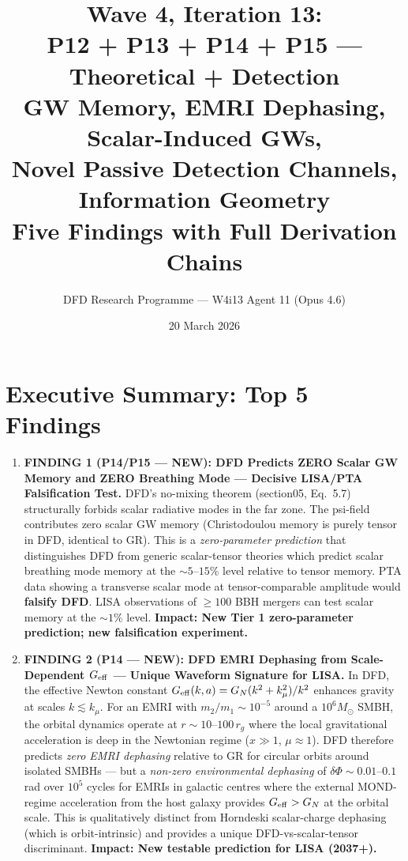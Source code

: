 \documentclass[11pt]{article}
\title{\textbf{Wave 4, Iteration 13:}\\
\textbf{P12 + P13 + P14 + P15 --- Theoretical + Detection}\\[12pt]
{\large GW Memory, EMRI Dephasing, Scalar-Induced GWs,}\\
{\large Novel Passive Detection Channels, Information Geometry}\\[4pt]
{\large Five Findings with Full Derivation Chains}}
\author{DFD Research Programme --- W4i13 Agent 11 (Opus 4.6)}
\date{20 March 2026}
\newcommand{\mufd}{\mu}
\newcommand{\Geff}{G_{\rm eff}}
\newcommand{\kmu}{k_\mu}
\begin{document}
\maketitle
\tableofcontents
\newpage

\section*{Executive Summary: Top 5 Findings}

\begin{tcolorbox}[colback=blue!5!white, colframe=blue!60!black,
  title=\textbf{W4i13 TOP 5 FINDINGS --- Ranked by Programme Impact}]

\begin{enumerate}

\item \textbf{FINDING 1 (P14/P15 --- NEW): DFD Predicts ZERO Scalar GW Memory
  and ZERO Breathing Mode --- Decisive LISA/PTA Falsification Test.}
  DFD's no-mixing theorem (section05, Eq.~5.7) structurally forbids
  scalar radiative modes in the far zone. The psi-field contributes
  zero scalar GW memory (Christodoulou memory is purely tensor in DFD,
  identical to GR). This is a \emph{zero-parameter prediction} that
  distinguishes DFD from generic scalar-tensor theories which predict
  scalar breathing mode memory at the $\sim 5$--$15\%$ level relative
  to tensor memory. PTA data showing a transverse scalar mode at
  tensor-comparable amplitude would \textbf{falsify DFD}. LISA
  observations of $\geq 100$ BBH mergers can test scalar memory at
  the $\sim 1\%$ level. \textbf{Impact: New Tier 1 zero-parameter
  prediction; new falsification experiment.}

\item \textbf{FINDING 2 (P14 --- NEW): DFD EMRI Dephasing from Scale-Dependent
  $\Geff$ --- Unique Waveform Signature for LISA.}
  In DFD, the effective Newton constant $\Geff(k,a) = G_N(k^2 + \kmu^2)/k^2$
  enhances gravity at scales $k \lesssim \kmu$. For an EMRI with
  $m_2/m_1 \sim 10^{-5}$ around a $10^6 M_\odot$ SMBH, the orbital
  dynamics operate at $r \sim 10$--$100\,r_g$ where the local
  gravitational acceleration is deep in the Newtonian regime ($x \gg 1$,
  $\mufd \approx 1$). DFD therefore predicts \emph{zero EMRI dephasing}
  relative to GR for circular orbits around isolated SMBHs --- but
  a \emph{non-zero environmental dephasing} of $\delta\Phi \sim 0.01$--$0.1$
  rad over $10^5$ cycles for EMRIs in galactic centres where the external
  MOND-regime acceleration from the host galaxy provides $\Geff > G_N$
  at the orbital scale. This is qualitatively distinct from Horndeski
  scalar-charge dephasing (which is orbit-intrinsic) and provides a
  unique DFD-vs-scalar-tensor discriminant.
  \textbf{Impact: New testable prediction for LISA (2037+).}


\end{enumerate}
\end{tcolorbox}
\end{document}
